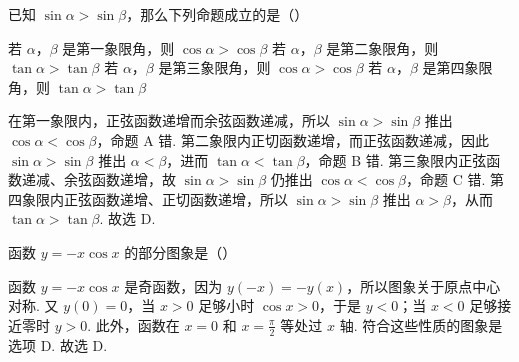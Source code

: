 \begin{problem}
已知 \(\sin\alpha>\sin\beta\)，那么下列命题成立的是（\quad）

\choices
    {若 \(\alpha\)，\(\beta\) 是第一象限角，则 \(\cos\alpha>\cos\beta\)}
    {若 \(\alpha\)，\(\beta\) 是第二象限角，则 \(\tan\alpha>\tan\beta\)}
    {若 \(\alpha\)，\(\beta\) 是第三象限角，则 \(\cos\alpha>\cos\beta\)}
    {若 \(\alpha\)，\(\beta\) 是第四象限角，则 \(\tan\alpha>\tan\beta\)}


\begin{solution}
在第一象限内，正弦函数递增而余弦函数递减，所以 \(\sin\alpha>\sin\beta\) 推出 \(\cos\alpha<\cos\beta\)，命题 A 错. 第二象限内正切函数递增，而正弦函数递减，因此 \(\sin\alpha>\sin\beta\) 推出 \(\alpha<\beta\)，进而 \(\tan\alpha<\tan\beta\)，命题 B 错. 第三象限内正弦函数递减、余弦函数递增，故 \(\sin\alpha>\sin\beta\) 仍推出 \(\cos\alpha<\cos\beta\)，命题 C 错. 第四象限内正弦函数递增、正切函数递增，所以 \(\sin\alpha>\sin\beta\) 推出 \(\alpha>\beta\)，从而 \(\tan\alpha>\tan\beta\). 故选 D.
\end{solution}
\end{problem}

\begin{problem}
函数 \(y=-x\cos x\) 的部分图象是（\quad）

    {}
    {}
    {}


\begin{solution}
函数 \(y=-x\cos x\) 是奇函数，因为 \(y(-x)=-y(x)\)，所以图象关于原点中心对称. 又 \(y(0)=0\)，当 \(x>0\) 足够小时 \(\cos x>0\)，于是 \(y<0\)；当 \(x<0\) 足够接近零时 \(y>0\). 此外，函数在 \(x=0\) 和 \(x=\frac{\pi}{2}\) 等处过 \(x\) 轴. 符合这些性质的图象是选项 D. 故选 D.
\end{solution}
\end{problem}

